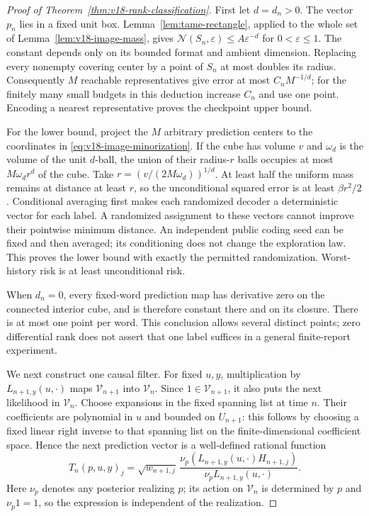 \documentclass[11pt]{amsart}
\theoremstyle{definition}\newtheorem{definition}[theorem]{Definition}
\theoremstyle{remark}\newtheorem{remark}[theorem]{Remark}
\begin{document}
\begin{proof}[Proof of Theorem~\ref{thm:v18-rank-classification}]
First let $d=d_n>0$. The vector $p_n$ lies in a fixed unit box.
Lemma~\ref{lem:tame-rectangle}, applied to the whole set of
Lemma~\ref{lem:v18-image-mass}, gives
$\mathcal N(S_n,\varepsilon)\le A\varepsilon^{-d}$ for
$0<\varepsilon\le1$. The constant depends only on its bounded format
and ambient dimension. Replacing every nonempty covering center by a
point of $S_n$ at most doubles its radius. Consequently $M$ reachable
representatives give error at most $C_nM^{-1/d}$; for the finitely many
small budgets in this deduction increase $C_n$ and use one point.
Encoding a nearest representative proves the checkpoint upper bound.

For the lower bound, project the $M$ arbitrary prediction centers to
the coordinates in \eqref{eq:v18-image-minorization}. If the cube has
volume $v$ and $\omega_d$ is the volume of the unit $d$-ball, the union
of their radius-$r$ balls occupies at most $M\omega_dr^d$ of the cube.
Take $r=(v/(2M\omega_d))^{1/d}$. At least half the uniform mass remains
at distance at least $r$, so the unconditional squared error is at
least $\beta r^2/2$. Conditional averaging first makes each randomized
decoder a deterministic vector for each label. A randomized assignment
to these vectors cannot improve their pointwise minimum distance.
An independent public coding seed can be fixed and then averaged;
its conditioning does not change the exploration law. This proves the
lower bound with exactly the permitted randomization. Worst-history
risk is at least unconditional risk.

When $d_n=0$, every fixed-word prediction map has derivative zero on
the connected interior cube, and is therefore constant there and on
its closure. There is at most one point per word. This conclusion
allows several distinct points; zero differential rank does not assert
that one label suffices in a general finite-report experiment.

We next construct one causal filter. For fixed $u,y$, multiplication
by $L_{n+1,y}(u,\cdot)$ maps $\mathscr V_{n+1}$ into $\mathscr V_n$.
Since $1\in\mathscr V_{n+1}$, it also puts the next likelihood in
$\mathscr V_n$. Choose expansions in the fixed spanning list at time
$n$. Their coefficients are polynomial in $u$ and bounded on $U_{n+1}$:
this follows by choosing a fixed linear right inverse to that spanning
list on the finite-dimensional coefficient space. Hence the next
prediction vector is a well-defined rational function
\begin{equation}\label{eq:v18-update}
 T_n(p,u,y)_j=\sqrt{w_{n+1,j}}\,
 \frac{\nu_p(L_{n+1,y}(u,\cdot)H_{n+1,j})}
      {\nu_p L_{n+1,y}(u,\cdot)}.
\end{equation}
Here $\nu_p$ denotes any posterior realizing $p$; its action on
$\mathscr V_n$ is determined by $p$ and $\nu_p1=1$, so the expression
is independent of the realization.


\end{proof}
\end{document}

